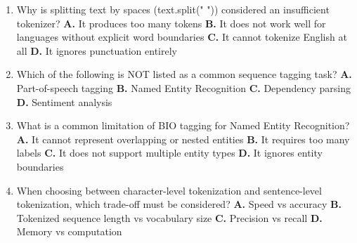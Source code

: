 \documentclass[11pt]{article}
\begin{document}
\begin{enumerate}[leftmargin=*]
  \item Why is splitting text by spaces (text.split(" ")) considered an insufficient tokenizer?
    \textbf{A.} It produces too many tokens
    \textbf{B.} It does not work well for languages without explicit word boundaries
    \textbf{C.} It cannot tokenize English at all
    \textbf{D.} It ignores punctuation entirely

  \item Which of the following is NOT listed as a common sequence tagging task?
    \textbf{A.} Part-of-speech tagging
    \textbf{B.} Named Entity Recognition
    \textbf{C.} Dependency parsing
    \textbf{D.} Sentiment analysis

  \item What is a common limitation of BIO tagging for Named Entity Recognition?
    \textbf{A.} It cannot represent overlapping or nested entities
    \textbf{B.} It requires too many labels
    \textbf{C.} It does not support multiple entity types
    \textbf{D.} It ignores entity boundaries

  \item When choosing between character-level tokenization and sentence-level tokenization, which trade-off must be considered?
    \textbf{A.} Speed vs accuracy
    \textbf{B.} Tokenized sequence length vs vocabulary size
    \textbf{C.} Precision vs recall
    \textbf{D.} Memory vs computation

\end{enumerate}
\end{document}
